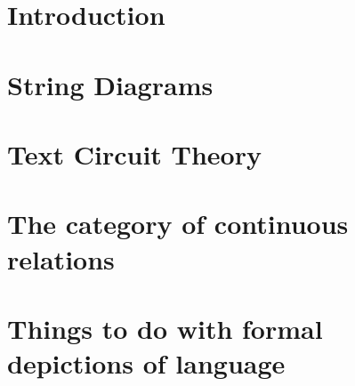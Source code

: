 



\maketitle%

\begin{fullwidth}
\begin{multicols}{2}
\tableofcontents
\end{multicols}
\end{fullwidth}

\chapter{Introduction}

\newpage



\chapter{String Diagrams}







%

\chapter{Text Circuit Theory}



\chapter{The category of continuous relations}











\chapter{Things to do with formal depictions of language}








